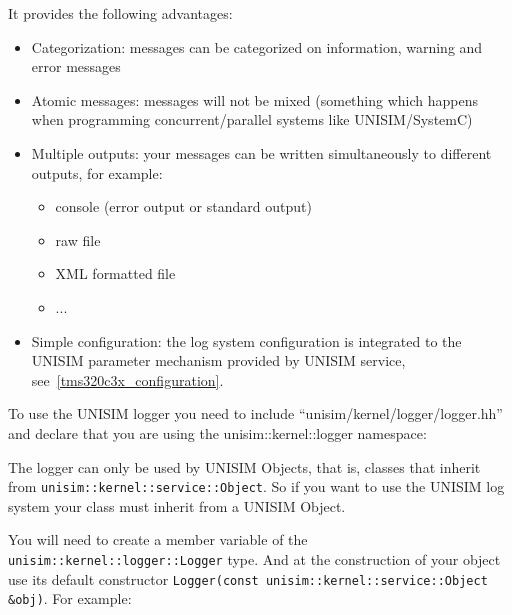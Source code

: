 It provides the following advantages:
\begin{itemize}
\item Categorization: messages can be categorized on information, warning and error messages
\item Atomic messages: messages will not be mixed (something which happens when programming concurrent/parallel systems like UNISIM/SystemC)
\item Multiple outputs: your messages can be written simultaneously to different outputs, for example:
	\begin{itemize}
	\item console (error output or standard output)
	\item raw file
	\item XML formatted file
	\item ...
	\end{itemize}
\item Simple configuration: the log system configuration is integrated to the UNISIM parameter mechanism provided by UNISIM service, see~\ref{tms320c3x_configuration}.
\end{itemize}

To use the UNISIM logger you need to include “unisim/kernel/logger/logger.hh” and declare that you are using the unisim::kernel::logger namespace:

\begin{center}
	
\end{center}

The logger can only be used by UNISIM Objects, that is, classes that inherit from \newline
\texttt{unisim::kernel::service::Object}. So if you want to use the UNISIM log system your class must inherit from a UNISIM Object.

\begin{center}
	
\end{center}

You will need to create a member variable of the \texttt{unisim::kernel::logger::Logger} type. And at the construction of your object use its default constructor \newline
\texttt{Logger(const unisim::kernel::service::Object \&obj)}. For example:

\begin{center}
	
\end{center}

